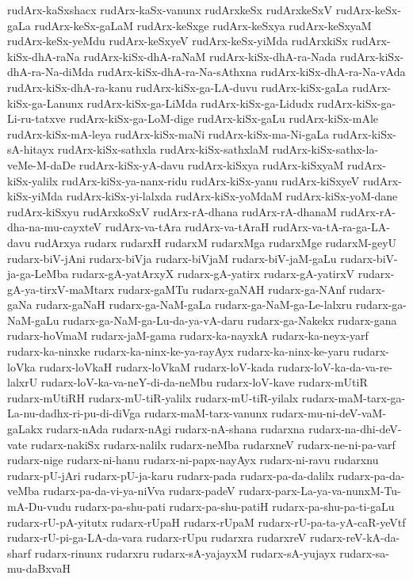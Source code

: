 {rudArx-kaSxshacx
rudArx-kaSx-vanunx
rudArxkeSx
rudArxkeSxV
rudArx-keSx-gaLa
rudArx-keSx-gaLaM
rudArx-keSxge
rudArx-keSxya
rudArx-keSxyaM
rudArx-keSx-yeMdu
rudArx-keSxyeV
rudArx-keSx-yiMda
rudArxkiSx
rudArx-kiSx-dhA-raNa
rudArx-kiSx-dhA-raNaM
rudArx-kiSx-dhA-ra-Nada
rudArx-kiSx-dhA-ra-Na-diMda
rudArx-kiSx-dhA-ra-Na-sAthxna
rudArx-kiSx-dhA-ra-Na-vAda
rudArx-kiSx-dhA-ra-kanu
rudArx-kiSx-ga-LA-duvu
rudArx-kiSx-gaLa
rudArx-kiSx-ga-Lanunx
rudArx-kiSx-ga-LiMda
rudArx-kiSx-ga-Lidudx
rudArx-kiSx-ga-Li-ru-tatxve
rudArx-kiSx-ga-LoM-dige
rudArx-kiSx-gaLu
rudArx-kiSx-mAle
rudArx-kiSx-mA-leya
rudArx-kiSx-maNi
rudArx-kiSx-ma-Ni-gaLa
rudArx-kiSx-sA-hitayx
rudArx-kiSx-sathxla
rudArx-kiSx-sathxlaM
rudArx-kiSx-sathx-la-veMe-M-daDe
rudArx-kiSx-yA-davu
rudArx-kiSxya
rudArx-kiSxyaM
rudArx-kiSx-yalilx
rudArx-kiSx-ya-nanx-ridu
rudArx-kiSx-yanu
rudArx-kiSxyeV
rudArx-kiSx-yiMda
rudArx-kiSx-yi-lalxda
rudArx-kiSx-yoMdaM
rudArx-kiSx-yoM-dane
rudArx-kiSxyu
rudArxkoSxV
rudArx-rA-dhana
rudArx-rA-dhanaM
rudArx-rA-dha-na-mu-cayxteV
rudArx-va-tAra
rudArx-va-tAraH
rudArx-va-tA-ra-ga-LA-davu
rudArxya
rudarx
rudarxH
rudarxM
rudarxMga
rudarxMge
rudarxM-geyU
rudarx-biV-jAni
rudarx-biVja
rudarx-biVjaM
rudarx-biV-jaM-gaLu
rudarx-biV-ja-ga-LeMba
rudarx-gA-yatArxyX
rudarx-gA-yatirx
rudarx-gA-yatirxV
rudarx-gA-ya-tirxV-maMtarx
rudarx-gaMTu
rudarx-gaNAH
rudarx-ga-NAnf
rudarx-gaNa
rudarx-gaNaH
rudarx-ga-NaM-gaLa
rudarx-ga-NaM-ga-Le-lalxru
rudarx-ga-NaM-gaLu
rudarx-ga-NaM-ga-Lu-da-ya-vA-daru
rudarx-ga-Nakekx
rudarx-gana
rudarx-hoVmaM
rudarx-jaM-gama
rudarx-ka-nayxkA
rudarx-ka-neyx-yarf
rudarx-ka-ninxke
rudarx-ka-ninx-ke-ya-rayAyx
rudarx-ka-ninx-ke-yaru
rudarx-loVka
rudarx-loVkaH
rudarx-loVkaM
rudarx-loV-kada
rudarx-loV-ka-da-va-re-lalxrU
rudarx-loV-ka-va-neY-di-da-neMbu
rudarx-loV-kave
rudarx-mUtiR
rudarx-mUtiRH
rudarx-mU-tiR-yalilx
rudarx-mU-tiR-yilalx
rudarx-maM-tarx-ga-La-nu-dadhx-ri-pu-di-diVga
rudarx-maM-tarx-vanunx
rudarx-mu-ni-deV-vaM-gaLakx
rudarx-nAda
rudarx-nAgi
rudarx-nA-shana
rudarxna
rudarx-na-dhi-deV-vate
rudarx-nakiSx
rudarx-nalilx
rudarx-neMba
rudarxneV
rudarx-ne-ni-pa-varf
rudarx-nige
rudarx-ni-hanu
rudarx-ni-papx-nayAyx
rudarx-ni-ravu
rudarxnu
rudarx-pU-jAri
rudarx-pU-ja-karu
rudarx-pada
rudarx-pa-da-dalilx
rudarx-pa-da-veMba
rudarx-pa-da-vi-ya-niVva
rudarx-padeV
rudarx-parx-La-ya-va-nunxM-Tu-mA-Du-vudu
rudarx-pa-shu-pati
rudarx-pa-shu-patiH
rudarx-pa-shu-pa-ti-gaLu
rudarx-rU-pA-yitutx
rudarx-rUpaH
rudarx-rUpaM
rudarx-rU-pa-ta-yA-caR-yeVtf
rudarx-rU-pi-ga-LA-da-vara
rudarx-rUpu
rudarxra
rudarxreV
rudarx-reV-kA-da-sharf
rudarx-rinunx
rudarxru
rudarx-sA-yajayxM
rudarx-sA-yujayx
rudarx-sa-mu-daBxvaH
}
